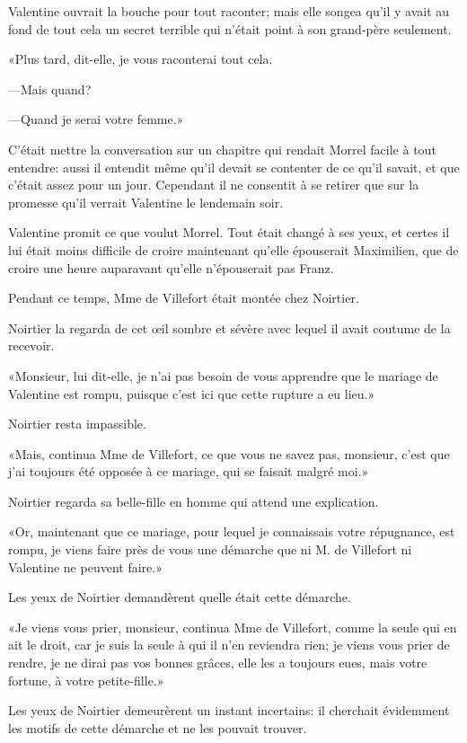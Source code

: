 Valentine ouvrait la bouche pour tout raconter; mais elle songea qu'il y avait au fond de tout cela un secret terrible qui n'était point à son grand-père seulement. 

«Plus tard, dit-elle, je vous raconterai tout cela.  

—Mais quand? 

—Quand je serai votre femme.» 

C'était mettre la conversation sur un chapitre qui rendait Morrel facile à tout entendre: aussi il entendit même qu'il devait se contenter de ce qu'il savait, et que c'était assez pour un jour. Cependant il ne consentit à se retirer que sur la promesse qu'il verrait Valentine le lendemain soir. 

Valentine promit ce que voulut Morrel. Tout était changé à ses yeux, et certes il lui était moins difficile de croire maintenant qu'elle épouserait Maximilien, que de croire une heure auparavant qu'elle n'épouserait pas Franz. 

Pendant ce temps, Mme de Villefort était montée chez Noirtier. 

Noirtier la regarda de cet œil sombre et sévère avec lequel il avait coutume de la recevoir. 

«Monsieur, lui dit-elle, je n'ai pas besoin de vous apprendre que le mariage de Valentine est rompu, puisque c'est ici que cette rupture a eu lieu.» 

Noirtier resta impassible. 

«Mais, continua Mme de Villefort, ce que vous ne savez pas, monsieur, c'est que j'ai toujours été opposée à ce mariage, qui se faisait malgré moi.» 

Noirtier regarda sa belle-fille en homme qui attend une explication. 

«Or, maintenant que ce mariage, pour lequel je connaissais votre répugnance, est rompu, je viens faire près de vous une démarche que ni M. de Villefort ni Valentine ne peuvent faire.» 

Les yeux de Noirtier demandèrent quelle était cette démarche. 

«Je viens vous prier, monsieur, continua Mme de Villefort, comme la seule qui en ait le droit, car je suis la seule à qui il n'en reviendra rien; je viens vous prier de rendre, je ne dirai pas vos bonnes grâces, elle les a toujours eues, mais votre fortune, à votre petite-fille.» 

Les yeux de Noirtier demeurèrent un instant incertains: il cherchait évidemment les motifs de cette démarche et ne les pouvait trouver. 

